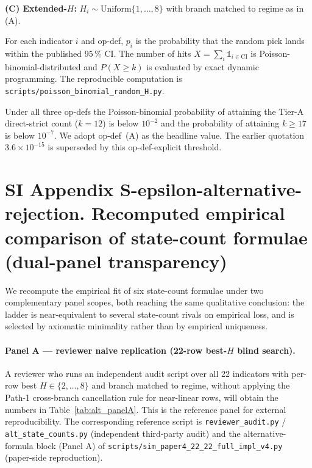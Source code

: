 \textbf{(C) Extended-$H$:} $H_i\sim\mathrm{Uniform}\{1,\dots,8\}$ with branch matched to regime as in (A).

For each indicator $i$ and op-def, $p_i$ is the probability that the random pick lands within the published 95\,\% CI. The number of hits $X = \sum_i \mathbb{1}_{i\in\mathrm{CI}}$ is Poisson-binomial-distributed and $P(X\!\ge\!k)$ is evaluated by exact dynamic programming. The reproducible computation is \texttt{scripts/poisson\_binomial\_random\_H.py}.

Under all three op-defs the Poisson-binomial probability of attaining the Tier-A direct-strict count ($k\!=\!12$) is below $10^{-2}$ and the probability of attaining $k\!\ge\!17$ is below $10^{-7}$. We adopt op-def~(A) as the headline value. The earlier quotation $3.6\!\times\!10^{-15}$ is superseded by this op-def-explicit threshold.

\clearpage
\section*{SI Appendix S-epsilon-alternative-rejection. Recomputed empirical comparison of state-count formulae (dual-panel transparency)}
\sloppy\label{sec:S-epsilon-alternative-rejection}

We recompute the empirical fit of six state-count formulae under two complementary panel scopes, both reaching the same qualitative conclusion: the ladder is near-equivalent to several state-count rivals on empirical loss, and is selected by axiomatic minimality rather than by empirical uniqueness.

\paragraph{Panel A --- reviewer naive replication (22-row best-$H$ blind search).}
A reviewer who runs an independent audit script over all 22 indicators with per-row best $H\!\in\!\{2,\dots,8\}$ and branch matched to regime, without applying the Path-1 cross-branch cancellation rule for near-linear rows, will obtain the numbers in Table~\ref{tab:alt_panelA}. This is the reference panel for external reproducibility. The corresponding reference script is \texttt{reviewer\_audit.py} / \texttt{alt\_state\_counts.py} (independent third-party audit) and the alternative-formula block (Panel A) of \texttt{scripts/sim\_paper4\_22\_22\_full\_impl\_v4.py} (paper-side reproduction).

